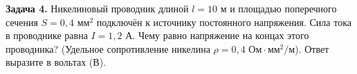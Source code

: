 
\begin{taskbasic}[code={\label{task:elem_ohm_v26_n25}}]
\textbf{Задача 4.} Никелиновый проводник длиной $l = 10\text{ м}$ и площадью поперечного сечения $S = 0{,}4\text{ мм}^2$ подключён к источнику постоянного напряжения. Сила тока в проводнике равна $I = 1{,}2\text{ А}$. Чему равно напряжение на концах этого проводника? (Удельное сопротивление никелина $\rho = 0{,}4\text{ Ом}\cdot\text{мм}^2/\text{м}$). Ответ выразите в вольтах (В).

\end{taskbasic}
